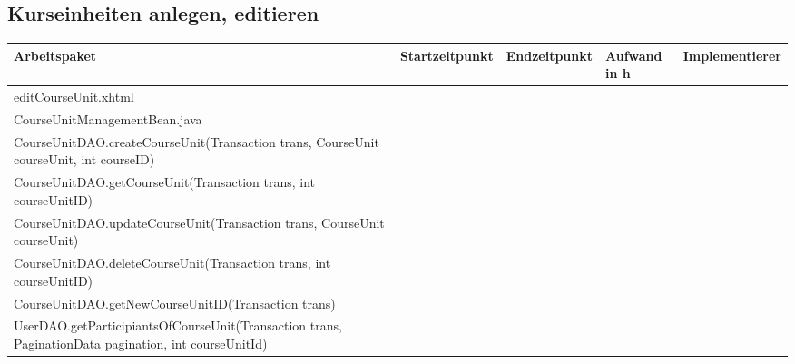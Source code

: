 \begin{landscape}
	\subsection{Kurseinheiten anlegen, editieren}
	\begin{tabular}{|p{10cm}|p{4cm}|p{3cm}|p{3cm}|p{3cm}|}
		\hline  \textbf{Arbeitspaket} & \textbf{Startzeitpunkt} & \textbf{Endzeitpunkt} & \textbf{Aufwand in h} & \textbf{Implementierer} \\ 
		\hline   editCourseUnit.xhtml                                       &                            &                            &                     &\\
		\hline   CourseUnitManagementBean.java                              &                            &                            &                     &\\
		\hline   CourseUnitDAO.createCourseUnit(Transaction trans, CourseUnit courseUnit, int courseID)  &                            &                             &                     &\\ 
		\hline   CourseUnitDAO.getCourseUnit(Transaction trans, int courseUnitID)                        &                            &                             &                     &\\ 
		\hline   CourseUnitDAO.updateCourseUnit(Transaction trans, CourseUnit courseUnit)                &                            &                             &                     &\\ 
		\hline   CourseUnitDAO.deleteCourseUnit(Transaction trans, int courseUnitID)                     &                            &                             &                     &\\ 
		\hline   CourseUnitDAO.getNewCourseUnitID(Transaction trans)        &                            &                            &                     &\\ 
		\hline   UserDAO.getParticipiantsOfCourseUnit(Transaction trans, PaginationData pagination, int courseUnitId)&                            &                             &                     &\\ 
		\hline 
	\end{tabular} \ \\
	\ \\
	
\end{landscape}




